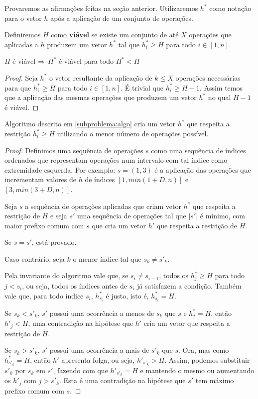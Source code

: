 Provaremos as afirmações feitas na seção anterior. Utilizaremos $h^*$ como notação para o vetor $h$ após a aplicação de um conjunto de operações.

Definiremos $H$ como \textbf{viável} se existe um conjunto de até $X$ operações que aplicadas a $h$ produzem um vetor $h^*$ tal que $h^*_i \geq H$ para todo $i \in [1, n]$.

\begin{prop}
    $H$ é viável $\Rightarrow$ $H^*$ é viável para todo $H^* < H$
\end{prop}

\begin{proof}
    Seja $h^*$ o vetor resultante da aplicação de $k \leq X$ operações necessárias para que $h^*_i \geq H$ para todo $i \in [1, n]$. É trivial que $h^*_i \geq H - 1$. Assim temos que a aplicação das mesmas operações que produzem um vetor $h^*$ no qual $H - 1$ é viável.
\end{proof}

\begin{prop}
    Algoritmo descrito em \ref{subproblema:algo} cria um vetor $h^*$ que respeita a restrição $h^*_i \geq H$ utilizando o menor número de operações possível.
\end{prop}

\begin{proof}
    Definimos uma sequência de operações $s$ como uma sequência de índices ordenados que representam operações num intervalo com tal índice como extremidade esquerda. Por exemplo: $s = (1, 3)$ é a aplicação das operações que incrementam valores de $h$ de índices $[1, min(1 + D, n)]$ e $[3, min(3 + D, n)]$.
    
    Seja $s$ a sequência de operações aplicadas que criam vetor $h^*$ que respeita a restrição de $H$ e seja $s'$ uma sequência de operações tal que $|s'|$ é mínimo, com maior prefixo comum com $s$ que cria um vetor $h'$ que respeita a restrição de $H$.
    
    Se $s = s'$, está provado.

    Caso contrário, seja $k$ o menor índice tal que $s_k \neq s'_k$.

    Pela invariante do algoritmo vale que, se $s_i \neq s_{i - 1}$, todos os $h^*_j \geq H$ para todo $j < s_i$, ou seja, todos os índices antes de $s_i$ já satisfazem a condição. Também vale que, para todo índice $s_i$, $h^*_{s_i}$ é justo, isto é, $h^*_{s_i} = H$.

    Se $s_k < s'_k$, $s'$ possui uma ocorrência a menos de $s_k$ que $s$ e $h^*_j = H$, então $h'_j < H$, uma contradição na hipótese que $h'$ cria um vetor que respeita a restrição de $H$.

    Se $s_k > s'_k$, $s'$ possui uma ocorrência a mais de $s'_k$ que $s$. Ora, mas como $h^*_{s'_k} = H$, então $h'$ apresenta folga, ou seja, $h'_{s'_k} > H$. Assim, podemos substituir $s'_k$ por $s_k$ em $s'$, fazendo com que $h'_{s'_k} = H$ e mantendo o mesmo ou aumentando os $h'_j$ com $j > s'_k$. Esta é uma contradição na hipótese que $s'$ tem máximo prefixo comum com $s$.

\end{proof}

